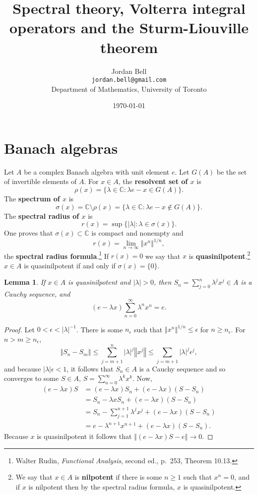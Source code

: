 \documentclass{article}
\newcommand{\norm}[1]{\left\Vert #1 \right\Vert}
\newtheorem{lemma}[theorem]{Lemma}
\theoremstyle{definition}
\begin{document}
\title{Spectral theory, Volterra integral operators and the Sturm-Liouville theorem}
\author{Jordan Bell\\ \texttt{jordan.bell@gmail.com}\\Department of Mathematics, University of Toronto}
\date{\today}

\maketitle

\section{Banach algebras}
Let $A$ be a complex Banach algebra with unit element $e$. 
Let $G(A)$ be the set of invertible elements of $A$.
For $x \in A$, the \textbf{resolvent set of $x$} is
\[
\rho(x) = \{\lambda \in \mathbb{C}: \lambda e-x  \in G(A)\}.
\]
The 
\textbf{spectrum of $x$} is
\[
\sigma(x) = \mathbb{C} \setminus \rho(x) = \{ \lambda \in \mathbb{C}: \lambda e-x  \not \in G(A)\}.
\]
The \textbf{spectral radius of $x$} is
\[
r(x) = \sup \{|\lambda| : \lambda \in \sigma(x)\}.
\]
One proves that $\sigma(x) \subset \mathbb{C}$ is compact and nonempty and
\[
r(x) = \lim_{n \to \infty} \norm{x^n}^{1/n},
\]
the \textbf{spectral radius formula}.\footnote{Walter Rudin, {\em Functional Analysis}, second ed., p.~253, Theorem 10.13.}
If $r(x)=0$ we say that $x$ is \textbf{quasinilpotent}.\footnote{We say that $x \in A$ is \textbf{nilpotent} if there is some $n \geq 1$ such that $x^n=0$,
and if $x$ is nilpotent then by the spectral radius formula, $x$ is quasinilpotent.}
$x \in A$ is quasinilpotent if and only if $\sigma(x)=\{0\}$.


\begin{lemma}
If  $x \in A$ is quasinilpotent and $|\lambda|>0$, then
$S_n = \sum_{j=0}^n \lambda^j x^j \in A$ is a Cauchy sequence, and
\[
(e-\lambda x)\sum_{n=0}^\infty \lambda^n x^n = e.
\]
\end{lemma}
\begin{proof}
Let $0<\epsilon < |\lambda|^{-1}$. There is some
$n_\epsilon$ such that $\norm{x^n}^{1/n}\leq \epsilon$ for $n \geq n_\epsilon$. 
For $n>m \geq n_\epsilon$,
\[
\norm{S_n-S_m} \leq \sum_{j=m+1}^n |\lambda|^j \norm{x^j}
\leq \sum_{j=m+1} |\lambda|^j \epsilon^j,
\]
and because $|\lambda| \epsilon<1$, it follows that $S_n \in A$ is a Cauchy sequence and so converges to 
some $S \in A$, $S = \sum_{n=0}^\infty \lambda^k x^k$. 
Now,
\begin{align*}
(e-\lambda x)S &= (e-\lambda x)S_n+(e-\lambda x)(S-S_n)\\
&=S_n - \lambda x S_n + (e-\lambda x)(S-S_n)\\
&=S_n - \sum_{j=1}^{n+1} \lambda^j x^j + (e-\lambda x)(S-S_n)\\
&=e-\lambda^{n+1} x^{n+1}+(e-\lambda x)(S-S_n).
\end{align*}
Because $x$ is quasinilpotent it follows that $\norm{(e-\lambda x)S - e} \to 0$. 
\end{proof}
\end{document}
